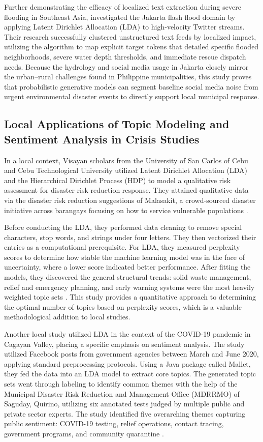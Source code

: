 Further demonstrating the efficacy of localized text extraction during severe
flooding in Southeast Asia, \textcite{rahmadan2020} investigated the Jakarta flash
flood domain by applying Latent Dirichlet Allocation (LDA) to high-velocity
Twitter streams. Their research successfully clustered unstructured text feeds
by localized impact, utilizing the algorithm to map explicit target tokens that
detailed specific flooded neighborhoods, severe water depth thresholds, and
immediate rescue dispatch needs. Because the hydrology and social media usage
in Jakarta closely mirror the urban--rural challenges found in Philippine
municipalities, this study proves that probabilistic generative models can
segment baseline social media noise from urgent environmental disaster events
to directly support local municipal response.

\subsection*{Local Applications of Topic Modeling and Sentiment Analysis in
	Crisis Studies}

In a local context, Visayan scholars from the University of San Carlos of Cebu
and Cebu Technological University utilized Latent Dirichlet Allocation (LDA)
and the Hierarchical Dirichlet Process (HDP) to model a qualitative risk
assessment for disaster risk reduction response. They attained qualitative data
via the disaster risk reduction suggestions of Malasakit, a crowd-sourced
disaster initiative across barangays focusing on how to service vulnerable
populations \parencite{gorro2021}.

Before conducting the LDA, they performed data cleaning to remove special
characters, stop words, and strings under four letters. They then vectorized
their entries as a computational prerequisite. For LDA, they measured
perplexity scores to determine how stable the machine learning model was in the
face of uncertainty, where a lower score indicated better performance. After
fitting the models, they discovered the general structural trends: solid waste
management, relief and emergency planning, and early warning systems were the
most heavily weighted topic sets \parencite{gorro2021}. This study provides a
quantitative approach to determining the optimal number of topics based on
perplexity scores, which is a valuable methodological addition to local
studies.

Another local study utilized LDA in the context of the COVID-19 pandemic in
Cagayan Valley, placing a specific emphasis on sentiment analysis. The study
utilized Facebook posts from government agencies between March and June 2020,
applying standard preprocessing protocols. Using a Java package called Mallet,
they fed the data into an LDA model to extract core topics. The generated topic
sets went through labeling to identify common themes with the help of the
Municipal Disaster Risk Reduction and Management Office (MDRRMO) of Saguday,
Quirino, utilizing six annotated tests judged by multiple public and private
sector experts. The study identified five overarching themes capturing public
sentiment: COVID-19 testing, relief operations, contact tracing, government
programs, and community quarantine \parencite{pagudpud2020}.

